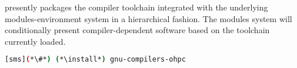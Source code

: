 \OHPC{} presently packages the \GNU{} compiler toolchain integrated with the 
underlying modules-environment system in a hierarchical fashion. The modules
system will conditionally present compiler-dependent software based on the
toolchain currently loaded. 

\begin{lstlisting}[language=bash]
[sms](*\#*) (*\install*) gnu-compilers-ohpc
\end{lstlisting}
